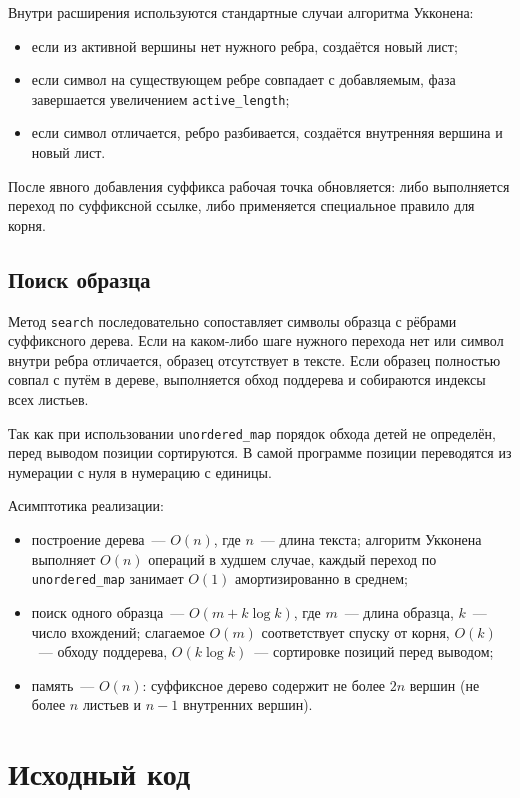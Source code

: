 Внутри расширения используются стандартные случаи алгоритма Укконена:
\begin{itemize}
\item если из активной вершины нет нужного ребра, создаётся новый лист;
\item если символ на существующем ребре совпадает с добавляемым, фаза завершается увеличением
\texttt{active\_length};
\item если символ отличается, ребро разбивается, создаётся внутренняя вершина и новый лист.
\end{itemize}

После явного добавления суффикса рабочая точка обновляется: либо выполняется переход по суффиксной
ссылке, либо применяется специальное правило для корня.

\subsection{Поиск образца}

Метод \texttt{search} последовательно сопоставляет символы образца с рёбрами суффиксного дерева. Если
на каком-либо шаге нужного перехода нет или символ внутри ребра отличается, образец отсутствует в
тексте. Если образец полностью совпал с путём в дереве, выполняется обход поддерева и собираются
индексы всех листьев.

Так как при использовании \texttt{unordered\_map} порядок обхода детей не определён, перед выводом
позиции сортируются. В самой программе позиции переводятся из нумерации с нуля в нумерацию с единицы.

Асимптотика реализации:
\begin{itemize}
\item построение дерева~--- $O(n)$, где $n$~--- длина текста; алгоритм Укконена
      выполняет $O(n)$ операций в худшем случае, каждый переход по
      \texttt{unordered\_map} занимает $O(1)$ амортизированно в среднем;
\item поиск одного образца~--- $O(m + k \log k)$, где $m$~--- длина образца,
      $k$~--- число вхождений; слагаемое $O(m)$ соответствует спуску от корня,
      $O(k)$~--- обходу поддерева, $O(k \log k)$~--- сортировке позиций перед выводом;
\item память~--- $O(n)$: суффиксное дерево содержит не более $2n$ вершин
      (не более $n$ листьев и $n - 1$ внутренних вершин).
\end{itemize}

\section{Исходный код}

